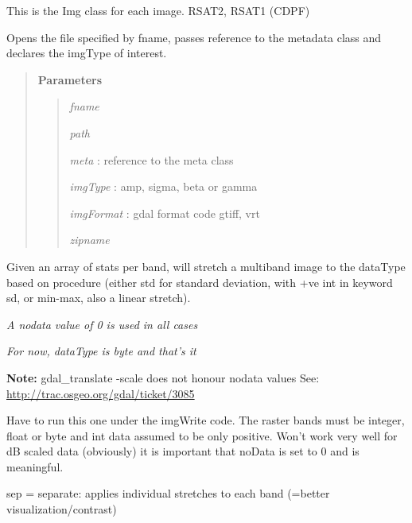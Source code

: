 \documentclass[letterpaper,10pt,openany,oneside]{sphinxmanual}
\begin{document}
\begin{fulllineitems}
\label{code:Image.Image}
This is the Img class for each image.  RSAT2, RSAT1 (CDPF)

Opens the file specified by fname, passes reference to the metadata class and declares the imgType of interest.
\begin{quote}

\textbf{Parameters}
\begin{quote}

\emph{fname}

\emph{path}

\emph{meta}      : reference to the meta class

\emph{imgType}   : amp, sigma, beta or gamma

\emph{imgFormat} : gdal format code gtiff, vrt

\emph{zipname}
\end{quote}
\end{quote}

\begin{fulllineitems}
\label{code:Image.Image.applyStretch}
Given an array of stats per band, will stretch a multiband image to the dataType based on
procedure (either std for standard deviation, with +ve int in keyword sd,
or min-max, also a linear stretch).

\emph{A nodata value of 0 is used in all cases}

\emph{For now, dataType is byte and that's it}

\textbf{Note:} gdal\_translate -scale does not honour nodata values
See: \href{http://trac.osgeo.org/gdal/ticket/3085}{http://trac.osgeo.org/gdal/ticket/3085}

Have to run this one under the imgWrite code. The raster bands must be integer, float or byte
and int data assumed to be only positive. Won't work very well for dB scaled data (obviously)
it is important that noData is set to 0 and is meaningful.

sep =  separate: applies individual stretches to each band (=better visualization/contrast)


\end{fulllineitems}
\end{fulllineitems}
\end{document}
